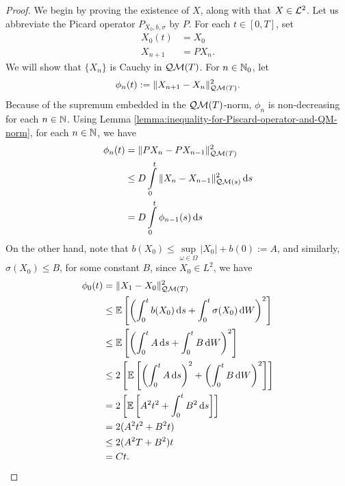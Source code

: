 \begin{proof}
  We begin by proving the existence of $X$, along with that $X\in\mathcal{L}^2$. Let us abbreviate the Picard operator $P_{X_0,b,\sigma}$ by $P$. For each $t\in[0,T]$, set
  \begin{align*}
    X_0(t)  & = X_0   \\
    X_{n+1} & = PX_n.
  \end{align*}
  We will show that $\{X_n\}$ is Cauchy in $\mathcal{Q}\mathcal{M}(T)$. For $n\in\mathbb{N}_0$, let
  \begin{equation}
    \phi_n(t) := \|X_{n+1}-X_n\|^2_{\mathcal{Q}\mathcal{M}(T)}.
  \end{equation}
  Because of the supremum embedded in the $\mathcal{Q}\mathcal{M}(T)$-norm, $\phi_n$ is non-decreasing for each $n\in\mathbb{N}$. Using Lemma \ref{lemma:inequality-for-Piscard-operator-and-QM-norm}, for each $n\in\mathbb{N}$, we have
  \begin{align*}
    \phi_n(t)
     & = \|PX_{n}-PX_{n-1}\|^2_{\mathcal{Q}\mathcal{M}(T)}                     \\
     & \le D\int\limits_0^t\|X_{n}-X_{n-1}\|_{\mathcal{Q}\mathcal{M}(s)}^2\,\mathrm{d} s \\
     & = D\int\limits_0^t\phi_{n-1}(s)\,\mathrm{d} s                   \\
  \end{align*}
  On the other hand, note that $b(X_0) \le \sup\limits_{\omega\in\Omega}|X_0| + b(0) := A$, and similarly, $\sigma(X_0)\le B$, for some constant $B$, since $X_0\in L^2$, we have
  \begin{align*}
    \phi_0(t)
     & = \|X_1-X_0\|^2_{\mathcal{Q}\mathcal{M}(T)}                                                                   \\
     & \le \mathbb{E}\left[\left(\int_0^tb(X_0)\,\mathrm{d} s + \int_0^t\sigma(X_0)\,\mathrm{d} W\right)^2\right]             \\
     & \le \mathbb{E}\left[\left(\int_0^tA\,\mathrm{d} s + \int_0^tB\,\mathrm{d} W\right)^2\right]                            \\
     & \le 2\left[\mathbb{E}\left[\left(\int_0^tA\,\mathrm{d} s\right)^2+\left(\int_0^tB\,\mathrm{d} W\right)^2\right]\right] \\
     & = 2\left[\mathbb{E}\left[A^2t^2+\int_0^tB^2\,\mathrm{d} s\right]\right]                                      \\
     & = 2(A^2t^2+B^2t)                                                                            \\
     & \le 2(A^2T+B^2)t                                                                            \\
     & = Ct.
  \end{align*}

\end{proof}
